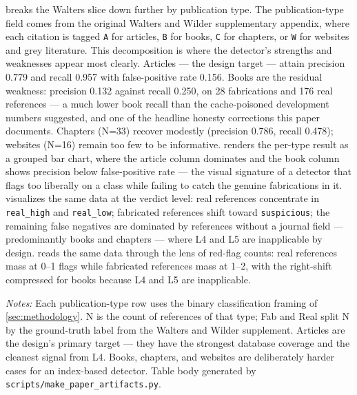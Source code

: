 \documentclass[12pt]{article}
\begin{document}
 breaks the Walters slice down further by publication type. The publication-type field comes from the original Walters and Wilder supplementary appendix, where each citation is tagged \texttt{A} for articles, \texttt{B} for books, \texttt{C} for chapters, or \texttt{W} for websites and grey literature. This decomposition is where the detector's strengths and weaknesses appear most clearly. Articles --- the design target --- attain precision 0.779 and recall 0.957 with false-positive rate 0.156. Books are the residual weakness: precision 0.132 against recall 0.250, on 28 fabrications and 176 real references --- a much lower book recall than the cache-poisoned development numbers suggested, and one of the headline honesty corrections this paper documents. Chapters (N=33) recover modestly (precision 0.786, recall 0.478); websites (N=16) remain too few to be informative.  renders the per-type result as a grouped bar chart, where the article column dominates and the book column shows precision below false-positive rate --- the visual signature of a detector that flags too liberally on a class while failing to catch the genuine fabrications in it.  visualizes the same data at the verdict level: real references concentrate in \texttt{real\_high} and \texttt{real\_low}; fabricated references shift toward \texttt{suspicious}; the remaining false negatives are dominated by references without a journal field --- predominantly books and chapters --- where L4 and L5 are inapplicable by design.  reads the same data through the lens of red-flag counts: real references mass at 0--1 flags while fabricated references mass at 1--2, with the right-shift compressed for books because L4 and L5 are inapplicable.

\begin{table}[htbp]
\centering
\caption{Metrics by publication type (Walters slice)}
\label{tab:eval-bypubtype}
\begin{threeparttable}

\begin{tablenotes}\small
\item \textit{Notes:} Each publication-type row uses the binary classification framing of \cref{sec:methodology}. N is the count of references of that type; Fab and Real split N by the ground-truth label from the Walters and Wilder supplement. Articles are the design's primary target — they have the strongest database coverage and the cleanest signal from L4. Books, chapters, and websites are deliberately harder cases for an index-based detector. Table body generated by \texttt{scripts/make\_paper\_artifacts.py}.
\end{tablenotes}
\end{threeparttable}
\end{table}
\end{document}
